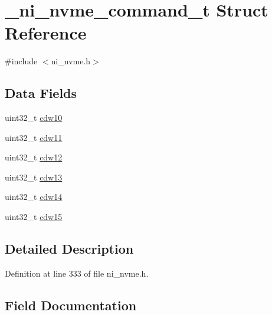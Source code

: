 \hypertarget{struct__ni__nvme__command__t}{}\section{\+\_\+ni\+\_\+nvme\+\_\+command\+\_\+t Struct Reference}
\label{struct__ni__nvme__command__t}


{\ttfamily \#include $<$ni\+\_\+nvme.\+h$>$}

\subsection*{Data Fields}
\begin{DoxyCompactItemize}
\item 
uint32\+\_\+t \mbox{\hyperlink{struct__ni__nvme__command__t_a0244505e23b12babb50fcb2c22fb60f9}{cdw10}}
\item 
uint32\+\_\+t \mbox{\hyperlink{struct__ni__nvme__command__t_a3eeb54f84f99f1bd217809493322a7c9}{cdw11}}
\item 
uint32\+\_\+t \mbox{\hyperlink{struct__ni__nvme__command__t_a0a8e085a116b5b78c95a54873a1401ce}{cdw12}}
\item 
uint32\+\_\+t \mbox{\hyperlink{struct__ni__nvme__command__t_a09453bfb66e62a93d1521be254e3c8ad}{cdw13}}
\item 
uint32\+\_\+t \mbox{\hyperlink{struct__ni__nvme__command__t_aeee003bd7c991c28797b413975ba4e84}{cdw14}}
\item 
uint32\+\_\+t \mbox{\hyperlink{struct__ni__nvme__command__t_a129a86603541eb2540156ee93ef472da}{cdw15}}
\end{DoxyCompactItemize}


\subsection{Detailed Description}


Definition at line 333 of file ni\+\_\+nvme.\+h.



\subsection{Field Documentation}
\mbox{\label{struct__ni__nvme__command__t_a0244505e23b12babb50fcb2c22fb60f9}} 

